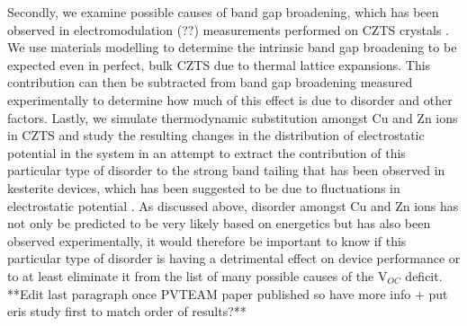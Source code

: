 Secondly, we examine possible causes of band gap broadening, which has been observed in electromodulation (??) measurements performed on CZTS crystals \cite{PVTEAM_paper}. We use materials modelling to determine the intrinsic band gap broadening to be expected even in perfect, bulk CZTS due to thermal lattice expansions. This contribution can then be subtracted from band gap broadening measured experimentally to determine how much of this effect is due to disorder and other factors. 
Lastly, we simulate thermodynamic substitution amongst Cu and Zn ions in CZTS and study the resulting changes in the distribution of electrostatic potential in the system in an attempt to extract the contribution of this particular type of disorder to the strong band tailing that has been observed in kesterite devices, which has been suggested to be due to fluctuations in electrostatic potential \cite{band_tail}.
As discussed above, disorder amongst Cu and Zn ions has not only be predicted to be very likely based on energetics but has also been observed experimentally, it would therefore be important to know if this particular type of disorder is having a detrimental effect on device performance or to at least eliminate it from the list of many possible causes of the V$_{OC}$ deficit.\\
**Edit last paragraph once PVTEAM paper published so have more info + put eris study first to match order of results?**
 


